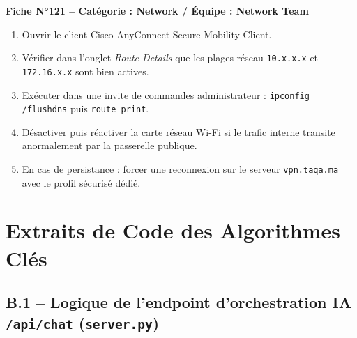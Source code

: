 \documentclass[12pt, a4paper, oneside]{report}
\begin{document}
\begin{remarque}
\textbf{Fiche N°121 -- Catégorie : Network / Équipe : Network Team}

\begin{enumerate}
  \item Ouvrir le client Cisco AnyConnect Secure Mobility Client.
  \item Vérifier dans l'onglet \textit{Route Details} que les plages réseau \texttt{10.x.x.x} et \texttt{172.16.x.x} sont bien actives.
  \item Exécuter dans une invite de commandes administrateur : \texttt{ipconfig /flushdns} puis \texttt{route print}.
  \item Désactiver puis réactiver la carte réseau Wi-Fi si le trafic interne transite anormalement par la passerelle publique.
  \item En cas de persistance : forcer une reconnexion sur le serveur \texttt{vpn.taqa.ma} avec le profil sécurisé dédié.
\end{enumerate}
\end{remarque}

\chapter{Extraits de Code des Algorithmes Clés}

\section*{B.1 -- Logique de l'endpoint d'orchestration IA \texttt{/api/chat} (\texttt{server.py})}
\end{document}
